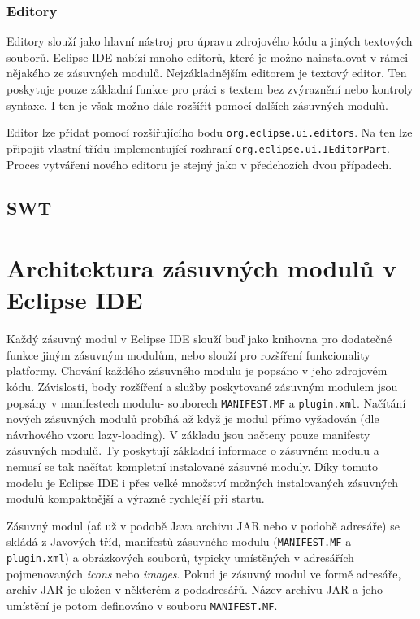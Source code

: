       \subsubsection{Editory}
      Editory slouží jako hlavní nástroj pro úpravu zdrojového kódu a jiných textových souborů. Eclipse IDE nabízí mnoho editorů, které je možno nainstalovat v rámci nějakého ze zásuvných modulů. Nejzákladnějším editorem je textový editor. Ten poskytuje pouze základní funkce pro práci s textem bez zvýraznění nebo kontroly syntaxe. I ten je však možno dále rozšířit pomocí dalších zásuvných modulů.

      Editor lze přidat pomocí rozšiřujícího bodu \texttt{org.eclipse.ui.editors}. Na ten lze připojit vlastní třídu implementující rozhraní \texttt{org.eclipse.ui.IEditorPart}. Proces vytváření nového editoru je stejný jako v předchozích dvou případech.

    \subsection{SWT}

  \section{Architektura zásuvných modulů v Eclipse IDE}
  Každý zásuvný modul v Eclipse IDE slouží buď jako knihovna pro dodatečné funkce jiným zásuvným modulům, nebo slouží pro rozšíření funkcionality platformy. Chování každého zásuvného modulu je popsáno v jeho zdrojovém kódu. Závislosti, body rozšíření a služby poskytované  zásuvným modulem jsou popsány v manifestech modulu- souborech \texttt{MANIFEST.MF} a \texttt{plugin.xml}. Načítání nových zásuvných modulů probíhá až když je modul přímo vyžadován (dle návrhového vzoru lazy-loading). V základu jsou načteny pouze manifesty zásuvných modulů. Ty poskytují základní informace o zásuvném modulu a nemusí se tak načítat kompletní instalované zásuvné moduly. Díky tomuto modelu je Eclipse IDE i přes velké množství možných instalovaných zásuvných modulů kompaktnější a výrazně rychlejší při startu.

  Zásuvný modul (ať už v podobě Java archivu JAR nebo v podobě adresáře) se skládá z Javových tříd, manifestů zásuvného modulu (\texttt{MANIFEST.MF} a \texttt{plugin.xml}) a obrázkových souborů, typicky umístěných v adresářích pojmenovaných \emph{icons} nebo \emph{images}. Pokud je zásuvný modul ve formě adresáře, archiv JAR je uložen v některém z podadresářů. Název archivu JAR a jeho umístění je potom definováno v souboru \texttt{MANIFEST.MF}.

